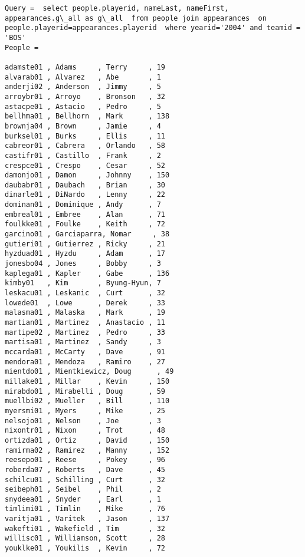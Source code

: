 \documentclass[11pt]{article}
\begin{document}
    \begin{Verbatim}[commandchars=\\\{\}]
Query =  select people.playerid, nameLast, nameFirst, appearances.g\_all as g\_all  from people join appearances  on people.playerid=appearances.playerid  where yearid='2004' and teamid = 'BOS'
People = 

adamste01 , Adams     , Terry     , 19        
alvarab01 , Alvarez   , Abe       , 1         
anderji02 , Anderson  , Jimmy     , 5         
arroybr01 , Arroyo    , Bronson   , 32        
astacpe01 , Astacio   , Pedro     , 5         
bellhma01 , Bellhorn  , Mark      , 138       
brownja04 , Brown     , Jamie     , 4         
burksel01 , Burks     , Ellis     , 11        
cabreor01 , Cabrera   , Orlando   , 58        
castifr01 , Castillo  , Frank     , 2         
crespce01 , Crespo    , Cesar     , 52        
damonjo01 , Damon     , Johnny    , 150       
daubabr01 , Daubach   , Brian     , 30        
dinarle01 , DiNardo   , Lenny     , 22        
dominan01 , Dominique , Andy      , 7         
embreal01 , Embree    , Alan      , 71        
foulkke01 , Foulke    , Keith     , 72        
garcino01 , Garciaparra, Nomar     , 38        
gutieri01 , Gutierrez , Ricky     , 21        
hyzduad01 , Hyzdu     , Adam      , 17        
jonesbo04 , Jones     , Bobby     , 3         
kaplega01 , Kapler    , Gabe      , 136       
kimby01   , Kim       , Byung-Hyun, 7         
leskacu01 , Leskanic  , Curt      , 32        
lowede01  , Lowe      , Derek     , 33        
malasma01 , Malaska   , Mark      , 19        
martian01 , Martinez  , Anastacio , 11        
martipe02 , Martinez  , Pedro     , 33        
martisa01 , Martinez  , Sandy     , 3         
mccarda01 , McCarty   , Dave      , 91        
mendora01 , Mendoza   , Ramiro    , 27        
mientdo01 , Mientkiewicz, Doug      , 49        
millake01 , Millar    , Kevin     , 150       
mirabdo01 , Mirabelli , Doug      , 59        
muellbi02 , Mueller   , Bill      , 110       
myersmi01 , Myers     , Mike      , 25        
nelsojo01 , Nelson    , Joe       , 3         
nixontr01 , Nixon     , Trot      , 48        
ortizda01 , Ortiz     , David     , 150       
ramirma02 , Ramirez   , Manny     , 152       
reesepo01 , Reese     , Pokey     , 96        
roberda07 , Roberts   , Dave      , 45        
schilcu01 , Schilling , Curt      , 32        
seibeph01 , Seibel    , Phil      , 2         
snydeea01 , Snyder    , Earl      , 1         
timlimi01 , Timlin    , Mike      , 76        
varitja01 , Varitek   , Jason     , 137       
wakefti01 , Wakefield , Tim       , 32        
willisc01 , Williamson, Scott     , 28        
youklke01 , Youkilis  , Kevin     , 72        

    \end{Verbatim}
\end{document}
